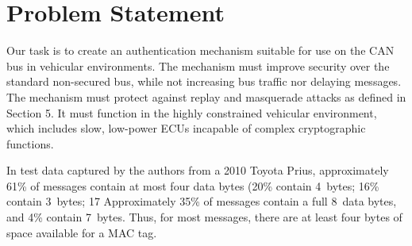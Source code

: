 \section{Problem Statement}
\label{problem}

Our task is to create an authentication mechanism suitable for use on the CAN bus in vehicular environments. 
The mechanism must improve security over the standard non-secured bus, while 
not increasing bus traffic nor delaying messages.
The mechanism must protect against replay and masquerade attacks as defined in Section 5.
It must function in the highly constrained vehicular environment,
which includes slow, low-power ECUs incapable of complex cryptographic functions.


In test data captured by the authors from a 2010 Toyota Prius, 
approximately 61\% of messages contain at most four data bytes
(20\% contain 4~bytes; 16\% contain 3~bytes; 17%
Approximately 35\% of messages contain a full 8~data bytes, and 4\% contain 7~bytes.
Thus, for most messages, there are at least four bytes of space
available for a MAC tag.

